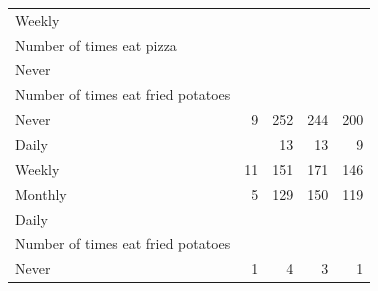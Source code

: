 \documentclass{article}
\begin{document}
\begin{table}[!h]
{\begin{tabular}{lllll}
			\multicolumn{1}{l}{\hspace{1em}Weekly} &
			\multicolumn{1}{|r}{} &
			\multicolumn{1}{r}{} &
			\multicolumn{1}{r}{} &
			\multicolumn{1}{r}{} \\
			\multicolumn{1}{l}{\hspace{2em}Number of times eat pizza} &
			\multicolumn{1}{|r}{} &
			\multicolumn{1}{r}{} &
			\multicolumn{1}{r}{} &
			\multicolumn{1}{r}{} \\
			\multicolumn{1}{l}{\hspace{3em}Never} &
			\multicolumn{1}{|r}{} &
			\multicolumn{1}{r}{} &
			\multicolumn{1}{r}{} &
			\multicolumn{1}{r}{} \\
			\multicolumn{1}{l}{\hspace{4em}Number of times eat fried potatoes} &
			\multicolumn{1}{|r}{} &
			\multicolumn{1}{r}{} &
			\multicolumn{1}{r}{} &
			\multicolumn{1}{r}{} \\
			\multicolumn{1}{l}{\hspace{5em}Never} &
			\multicolumn{1}{|r}{9} &
			\multicolumn{1}{r}{252} &
			\multicolumn{1}{r}{244} &
			\multicolumn{1}{r}{200} \\
			\multicolumn{1}{l}{\hspace{5em}Daily} &
			\multicolumn{1}{|r}{} &
			\multicolumn{1}{r}{13} &
			\multicolumn{1}{r}{13} &
			\multicolumn{1}{r}{9} \\
			\multicolumn{1}{l}{\hspace{5em}Weekly} &
			\multicolumn{1}{|r}{11} &
			\multicolumn{1}{r}{151} &
			\multicolumn{1}{r}{171} &
			\multicolumn{1}{r}{146} \\
			\multicolumn{1}{l}{\hspace{5em}Monthly} &
			\multicolumn{1}{|r}{5} &
			\multicolumn{1}{r}{129} &
			\multicolumn{1}{r}{150} &
			\multicolumn{1}{r}{119} \\
			\multicolumn{1}{l}{\hspace{3em}Daily} &
			\multicolumn{1}{|r}{} &
			\multicolumn{1}{r}{} &
			\multicolumn{1}{r}{} &
			\multicolumn{1}{r}{} \\
			\multicolumn{1}{l}{\hspace{4em}Number of times eat fried potatoes} &
			\multicolumn{1}{|r}{} &
			\multicolumn{1}{r}{} &
			\multicolumn{1}{r}{} &
			\multicolumn{1}{r}{} \\
			\multicolumn{1}{l}{\hspace{5em}Never} &
			\multicolumn{1}{|r}{1} &
			\multicolumn{1}{r}{4} &
			\multicolumn{1}{r}{3} &
			\multicolumn{1}{r}{1} \\

\end{tabular}}
\end{table}
\end{document}

